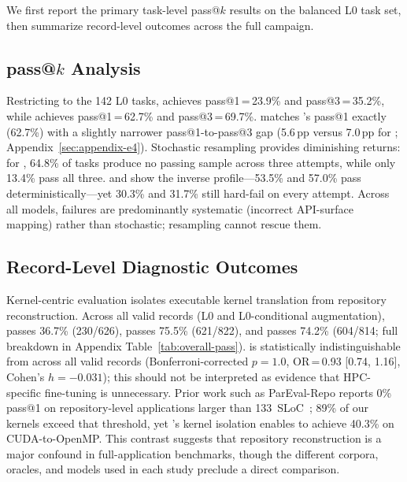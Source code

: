 We first report the primary task-level pass@$k$ results on the balanced L0 task set, then summarize record-level outcomes across the full campaign.

\subsection{pass@$k$ Analysis}
\label{sec:passk-analysis}
Restricting to the 142 L0 tasks, \qwenshort{} achieves pass@1\,=\,23.9\% and pass@3\,=\,35.2\%, while \gptnew{} achieves pass@1\,=\,62.7\% and pass@3\,=\,69.7\%. \codex{} matches \gptnew{}'s pass@1 exactly (62.7\%) with a slightly narrower pass@1-to-pass@3 gap (5.6\,pp versus 7.0\,pp for \gptnew{}; Appendix~\ref{sec:appendix-e4}). Stochastic resampling provides diminishing returns: for \qwenshort{}, 64.8\% of tasks produce no passing sample across three attempts, while only 13.4\% pass all three. \gptnew{} and \codex{} show the inverse profile---53.5\% and 57.0\% pass deterministically---yet 30.3\% and 31.7\% still hard-fail on every attempt. Across all models, failures are predominantly systematic (incorrect API-surface mapping) rather than stochastic; resampling cannot rescue them.

\subsection{Record-Level Diagnostic Outcomes}
\label{sec:overall-pass}

Kernel-centric evaluation isolates executable kernel translation from repository reconstruction. Across all valid records (L0 and L0-conditional augmentation), \qwenshort{} passes 36.7\% (230/626), \gptnew{} passes 75.5\% (621/822), and \codex{} passes 74.2\% (604/814; full breakdown in Appendix Table~\ref{tab:overall-pass}). \codex{} is statistically indistinguishable from \gptnew{} across all valid records (Bonferroni-corrected $p = 1.0$, OR\,=\,0.93 [0.74, 1.16], Cohen's $h = -0.031$); this should not be interpreted as evidence that HPC-specific fine-tuning is unnecessary. Prior work such as ParEval-Repo reports 0\% pass@1 on repository-level applications larger than 133~SLoC~\cite{ParEvalRepo2025}; 89\% of our kernels exceed that threshold, yet \parbench{}'s kernel isolation enables \qwenshort{} to achieve 40.3\% on CUDA-to-OpenMP. This contrast suggests that repository reconstruction is a major confound in full-application benchmarks, though the different corpora, oracles, and models used in each study preclude a direct comparison.

